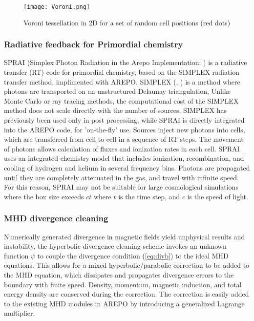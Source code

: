 \documentclass[11pt]{article}
\begin{document}
\begin{figure}[h!]
         \centering
		\texttt{[image: Voroni.png]}
		\caption{Voroni tessellation in 2D for a set of random cell positions (red dots) \citep{Springel2010}}
		\label{fig:voroni}
\end{figure}

\subsubsection{Radiative feedback for Primordial chemistry}
SPRAI (Simplex Photon Radiation in the Arepo Implementation: \citealt{Jaura2018}) is a radiative transfer (RT) code for primordial chemistry, based on the SIMPLEX radiation transfer method, implimented with AREPO. SIMPLEX (\citealt{Ritzerveld2006}, \citealt{Kruip2010}) is a method where photons are transported on an unstructured Delaunay triangulation, Unlike Monte Carlo or ray tracing methods, the computational cost of the SIMPLEX method does not scale directly with the number of sources. SIMPLEX has previously been used only in post processing, while SPRAI is directly integrated into the AREPO code, for 'on-the-fly' use. Sources inject new photons into cells, which are transferred from cell to cell in a sequence of RT steps. The movement of photons allows calculation of fluxes and ionization rates in each cell. SPRAI uses an integrated chemistry model that includes ionization, recombination, and cooling of hydrogen and helium in several frequency bins. Photons are propagated until they are completely attenuated in the gas, and travel with infinite speed. For this reason, SPRAI may not be suitable for large cosmological simulations where the box size exceeds $ct$ where $t$ is the time step, and $c$ is the speed of light.

\subsubsection{MHD divergence cleaning}
Numerically generated divergence in magnetic fields yield unphysical results and instability, the \cite{Dedner2002} hyperbolic divergence cleaning scheme invokes an unknown function $\psi$ to couple the divergence condition (\ref{eq:divb}) to the ideal MHD equations. This allows for a mixed hyperbolic/parabolic correction to be added to the MHD equation, which dissipates and propagates divergence errors to the boundary with finite speed. Density, momentum, magnetic induction, and total energy density are conserved during the correction. The correction is easily added to the existing MHD modules in AREPO by introducing a generalized Lagrange multiplier.
\end{document}
